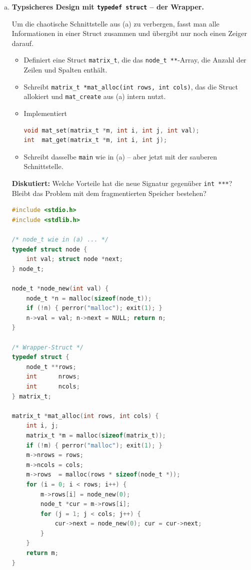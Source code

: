 \begin{enumerate}[a)]
\item \textbf{Typsicheres Design mit \texttt{typedef struct} -- der Wrapper.}

Um die chaotische Schnittstelle aus (a) zu verbergen, fasst man alle Informationen in einer
Struct zusammen und übergibt nur noch einen Zeiger darauf.

\begin{itemize}
  \item Definiert eine Struct \texttt{matrix\_t}, die das \texttt{node\_t **}-Array,
        die Anzahl der Zeilen und Spalten enthält.
  \item Schreibt \texttt{matrix\_t *mat\_alloc(int rows, int cols)},
        das die Struct allokiert und \texttt{mat\_create} aus (a) intern nutzt.
  \item Implementiert
\begin{lstlisting}[language=C]
void mat_set(matrix_t *m, int i, int j, int val);
int  mat_get(matrix_t *m, int i, int j);
\end{lstlisting}
  \item Schreibt dasselbe \texttt{main} wie in (a) -- aber jetzt mit der sauberen Schnittstelle.
\end{itemize}

\textbf{Diskutiert:} Welche Vorteile hat die neue Signatur gegenüber \texttt{int ***}?
Bleibt das Problem mit dem fragmentierten Speicher bestehen?

\begin{loesung}
\begin{lstlisting}[language=C]
#include <stdio.h>
#include <stdlib.h>

/* node_t wie in (a) ... */
typedef struct node {
    int val; struct node *next;
} node_t;

node_t *node_new(int val) {
    node_t *n = malloc(sizeof(node_t));
    if (!n) { perror("malloc"); exit(1); }
    n->val = val; n->next = NULL; return n;
}

/* Wrapper-Struct */
typedef struct {
    node_t **rows;
    int      nrows;
    int      ncols;
} matrix_t;

matrix_t *mat_alloc(int rows, int cols) {
    int i, j;
    matrix_t *m = malloc(sizeof(matrix_t));
    if (!m) { perror("malloc"); exit(1); }
    m->nrows = rows;
    m->ncols = cols;
    m->rows  = malloc(rows * sizeof(node_t *));
    for (i = 0; i < rows; i++) {
        m->rows[i] = node_new(0);
        node_t *cur = m->rows[i];
        for (j = 1; j < cols; j++) {
            cur->next = node_new(0); cur = cur->next;
        }
    }
    return m;
}


\end{lstlisting}
\end{loesung}
\end{enumerate}
